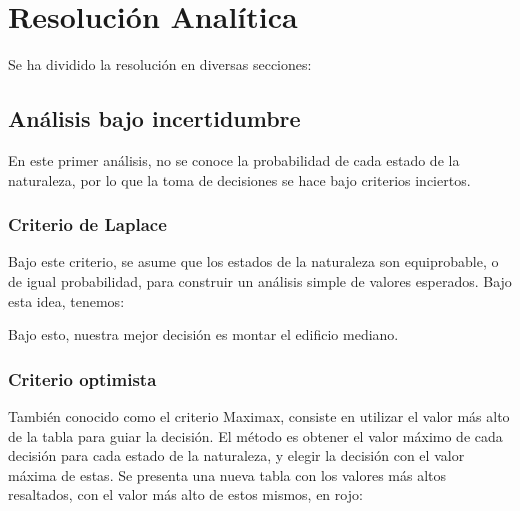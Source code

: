 \section{Resolución Analítica}
Se ha dividido la resolución en diversas secciones:

\subsection{Análisis bajo incertidumbre}
En este primer análisis, no se conoce la probabilidad de cada estado de la naturaleza, por lo que la toma de decisiones se hace bajo criterios inciertos.

\subsubsection{Criterio de Laplace}
Bajo este criterio, se asume que los estados de la naturaleza son equiprobable, o de igual probabilidad, para construir un análisis simple de valores esperados. Bajo esta idea, tenemos:


Bajo esto, nuestra mejor decisión es montar el edificio mediano.

\subsubsection{Criterio optimista}
También conocido como el criterio Maximax, consiste en utilizar el valor más alto de la tabla para guiar la decisión. El método es obtener el valor máximo de cada decisión para cada estado de la naturaleza, y elegir la decisión con el valor máxima de estas. Se presenta una nueva tabla con los valores más altos resaltados, con el valor más alto de estos mismos, en rojo:

